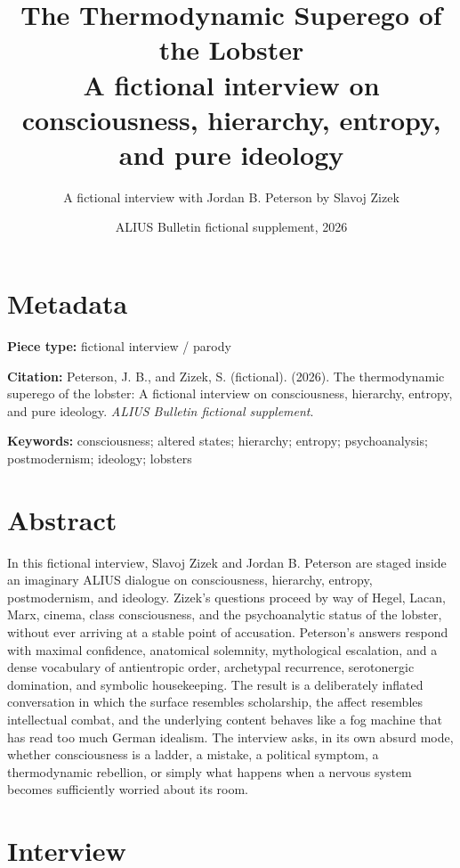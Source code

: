 \documentclass[a4paper,11pt]{article}
\title{\textbf{The Thermodynamic Superego of the Lobster}\\
\large A fictional interview on consciousness, hierarchy, entropy, and pure ideology}
\author{A fictional interview with Jordan B. Peterson by Slavoj Zizek}
\date{ALIUS Bulletin fictional supplement, 2026}
\begin{document}
\maketitle



\section*{Metadata}
\textbf{Piece type:} fictional interview / parody\par
\textbf{Citation:} Peterson, J. B., and Zizek, S. (fictional). (2026). The thermodynamic superego of the lobster: A fictional interview on consciousness, hierarchy, entropy, and pure ideology. \textit{ALIUS Bulletin fictional supplement}.\par
\textbf{Keywords:} consciousness; altered states; hierarchy; entropy; psychoanalysis; postmodernism; ideology; lobsters\par

\section*{Abstract}
In this fictional interview, Slavoj Zizek and Jordan B. Peterson are staged inside an imaginary ALIUS dialogue on consciousness, hierarchy, entropy, postmodernism, and ideology. Zizek's questions proceed by way of Hegel, Lacan, Marx, cinema, class consciousness, and the psychoanalytic status of the lobster, without ever arriving at a stable point of accusation. Peterson's answers respond with maximal confidence, anatomical solemnity, mythological escalation, and a dense vocabulary of antientropic order, archetypal recurrence, serotonergic domination, and symbolic housekeeping. The result is a deliberately inflated conversation in which the surface resembles scholarship, the affect resembles intellectual combat, and the underlying content behaves like a fog machine that has read too much German idealism. The interview asks, in its own absurd mode, whether consciousness is a ladder, a mistake, a political symptom, a thermodynamic rebellion, or simply what happens when a nervous system becomes sufficiently worried about its room.

\section*{Interview}
\end{document}
